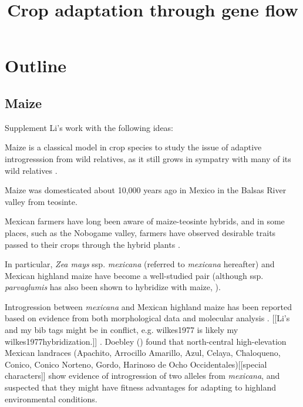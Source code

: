 \documentclass[11pt]{article}
\title{Crop adaptation through gene flow}
\begin{document}
\maketitle

\section*{Outline}






\subsection*{Maize}


Supplement Li's work with the following ideas:


Maize is a classical model in crop species to study the issue of adaptive introgresssion from wild relatives, as it still grows in sympatry with many of its wild relatives \cite{hufford2013}.

Maize was domesticated about 10,000 years ago in Mexico \cite{smith1997initial} \cite{hufford2012comparative} in the Balsas River valley \cite{matsuoka2002single} from teosinte.

Mexican farmers have long been aware of maize-teosinte hybrids, and in some places, such as the Nobogame valley, farmers have observed desirable traits passed to their crops through the hybrid plants \cite{wilkes1977hybridization} \cite{lumholtz1902unknown} \cite{wilkes1970teosinte}.

In particular, \emph{Zea mays} ssp. \emph{mexicana} (referred to \emph{mexicana} hereafter) and Mexican highland maize have become a well-studied pair (although ssp. \emph{parvaglumis} has also been shown to hybridize with maize, \cite{wilkes1977hybridization}).

Introgression between \emph{mexicana} and Mexican highland maize has been reported based on evidence from both morphological data \cite{wilkes1977, lauter2004, doebley1984} and molecular analysis \cite{matsuoka2002, vanHeerwaarden2011, doebley1987, warburton2011, fukunaga2005}. [[Li's and my bib tags might be in conflict, e.g. wilkes1977 is likely my wilkes1977hybridization.]]
.
 Doebley (\cite{doebley1987patterns}) found that north-central high-elevation Mexican landraces (Apachito, Arrocillo Amarillo, Azul, Celaya, Chaloqueno, Conico, Conico Norteno, Gordo, Harinoso de Ocho Occidentales)[[special characters]] show evidence of introgression of two alleles from \emph{mexicana}, and suspected that they might have fitness advantages for adapting to highland environmental conditions.
\end{document}
